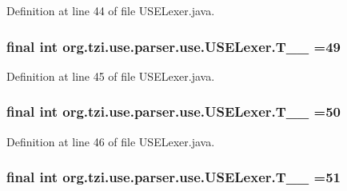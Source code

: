 Definition at line 44 of file U\-S\-E\-Lexer.\-java.

\hypertarget{classorg_1_1tzi_1_1use_1_1parser_1_1use_1_1_u_s_e_lexer_a62c768788c20536c7ed19defca265e93}{
\subsubsection[{T\-\_\-\-\_\-49}]{\setlength{\rightskip}{0pt plus 5cm}final int org.\-tzi.\-use.\-parser.\-use.\-U\-S\-E\-Lexer.\-T\-\_\-\-\_ =49\hspace{0.3cm}{\ttfamily [static]}}}\label{classorg_1_1tzi_1_1use_1_1parser_1_1use_1_1_u_s_e_lexer_a62c768788c20536c7ed19defca265e93}


Definition at line 45 of file U\-S\-E\-Lexer.\-java.

\hypertarget{classorg_1_1tzi_1_1use_1_1parser_1_1use_1_1_u_s_e_lexer_a96a75a32b6835db4aee74d99a404a88e}{
\subsubsection[{T\-\_\-\-\_\-50}]{\setlength{\rightskip}{0pt plus 5cm}final int org.\-tzi.\-use.\-parser.\-use.\-U\-S\-E\-Lexer.\-T\-\_\-\-\_ =50\hspace{0.3cm}{\ttfamily [static]}}}\label{classorg_1_1tzi_1_1use_1_1parser_1_1use_1_1_u_s_e_lexer_a96a75a32b6835db4aee74d99a404a88e}


Definition at line 46 of file U\-S\-E\-Lexer.\-java.

\hypertarget{classorg_1_1tzi_1_1use_1_1parser_1_1use_1_1_u_s_e_lexer_ad48fa18241f83208f967ce478f1f99b4}{
\subsubsection[{T\-\_\-\-\_\-51}]{\setlength{\rightskip}{0pt plus 5cm}final int org.\-tzi.\-use.\-parser.\-use.\-U\-S\-E\-Lexer.\-T\-\_\-\-\_ =51\hspace{0.3cm}{\ttfamily [static]}}}\label{classorg_1_1tzi_1_1use_1_1parser_1_1use_1_1_u_s_e_lexer_ad48fa18241f83208f967ce478f1f99b4}


